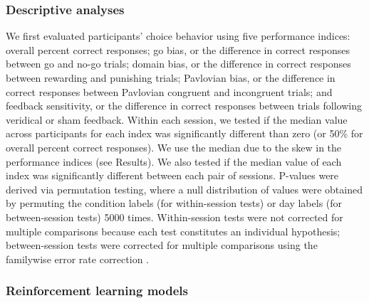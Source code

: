 \documentclass[a4paper,12pt]{article}
\begin{document}
\begin{refsection}[main]
\begin{figure}[t]
    \centerline{}
    \caption{}
    \label{fig:task_schematic}
\end{figure}

\subsubsection*{Descriptive analyses}

We first evaluated participants' choice behavior using five performance indices: overall percent correct responses; go bias, or the difference in correct responses between go and no-go trials; domain bias, or the difference in correct responses between rewarding and punishing trials; Pavlovian bias, or the difference in correct responses between Pavlovian congruent and incongruent trials; and feedback sensitivity, or the difference in correct responses between trials following veridical or sham feedback. Within each session, we tested if the median value across participants for each index was significantly different than zero (or 50\% for overall percent correct responses). We use the median due to the skew in the performance indices (see Results). We also tested if the median value of each index was significantly different between each pair of sessions. P-values were derived via permutation testing, where a null distribution of values were obtained by permuting the condition labels (for within-session tests) or day labels (for between-session tests) 5000 times. Within-session tests were not corrected for multiple comparisons because each test constitutes an individual hypothesis; between-session tests were corrected for multiple comparisons using the familywise error rate correction \cite{winkler2014permutation}.

\subsubsection*{Reinforcement learning models}


\end{refsection}
\end{document}
